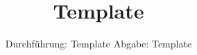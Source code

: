 

\subject{vTemplate}
\title{Template}
\date{%
  Durchführung: Template
  \hspace{3em}
  Abgabe: Template
}



\maketitle
\thispagestyle{empty}
\tableofcontents
\newpage






\printbibliography{}

